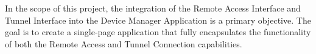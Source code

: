 In the scope of this project, 
the integration of the Remote Access Interface and Tunnel Interface 
into the Device Manager Application is a primary objective. 
The goal is to create a single-page application 
that fully encapsulates the functionality of both 
the Remote Access and Tunnel Connection capabilities.